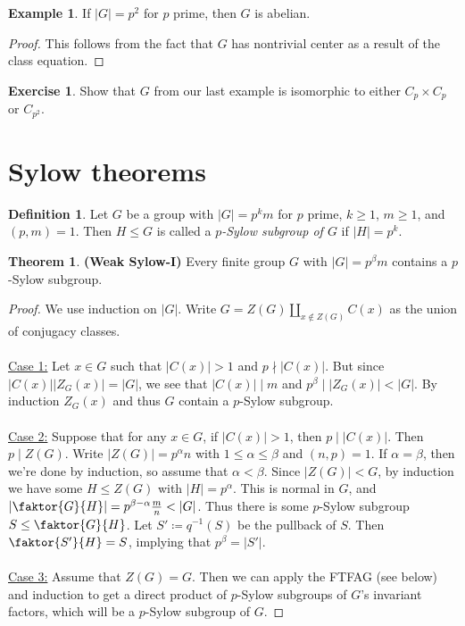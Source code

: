 \documentclass[10pt,letterpaper,cm]{nupset}
\theoremstyle{definition}
\newtheorem*{definition}{Definition}
\newtheorem{exmp}{Example}
\newtheorem{theorem}{Theorem}
\newtheorem{exercise}{Exercise}
\newcommand{\1}{\mathbf{1}}
\newcommand{\0}{\vec 0}
\begin{document}
\begin{exmp}
If $|G| =p^2$ for $p$ prime, then $G$ is abelian.
\end{exmp}
\begin{proof}
This follows from the fact that $G$ has nontrivial center as a result of the class equation.
\end{proof}

\begin{exercise}
Show that $G$ from our last example is isomorphic to either $C_p \times C_p$ or $C_{p^2}$.
\end{exercise}

\section{Sylow theorems}

\begin{definition}
Let $G$ be a group with $|G|= p^km$ for $p$ prime, $k\geq 1$, $m\geq 1$, and $(p,m) =1$. Then $H \leq G$ is called a \textit{$p$-Sylow subgroup of $G$} if $|H| = p^k$.
\end{definition}

\begin{theorem}{\textbf{(Weak Sylow-I)}}
Every finite group $G$ with $|G| = p^{\beta}m$ contains a $p$-Sylow subgroup.
\end{theorem}
\begin{proof}
We use induction on $|G|$. Write $G= Z(G) \coprod_{x\notin Z(G)} C(x)$ as the union of conjugacy classes. \\ \\ \underline{Case 1:} Let $x\in G$ such that $|C(x)|>1$ and $p\nmid |C(x)|$. But since $|C(x)||Z_G(x)| =|G|$, we see that $|C(x)| \mid m$ and $p^{\beta}\mid |Z_G(x)|< |G|$. By induction $Z_G(x)$ and thus $G$ contain a $p$-Sylow subgroup.
\\ \\ \underline{Case 2:}
 Suppose that for any $x\in G$, if $|C(x)| >1$, then $p\mid |C(x)|$. Then $p\mid Z(G)$. Write $|Z(G)| = p^{\alpha}n$ with $1\leq \alpha\leq \beta$ and $(n, p)=1$. If $\alpha = \beta$, then we're done by induction, so assume that $\alpha <
 \beta$. Since $|Z(G)| < G$, by induction we have some $H\leq Z(G)$ with $|H| = p^{\alpha}$. This is normal in $G$, and $|\faktor{G}{H}| = p^{\beta - \alpha}\frac{m}{n} < |G|$. Thus there is some $p$-Sylow subgroup $S\leq \faktor{G}{H}$.  Let $S'\coloneqq q^{-1}(S)$ be the pullback of $S$.  Then $\faktor{S'}{H} =S$, implying that $p^{\beta}= |S'|$. 
\\ \\ \underline{Case 3:} Assume that $Z(G) = G$. Then we can apply the FTFAG (see below) and induction to get a direct product of $p$-Sylow subgroups of $G$'s invariant factors, which will be a $p$-Sylow subgroup of $G$. 
\end{proof}
\end{document}
